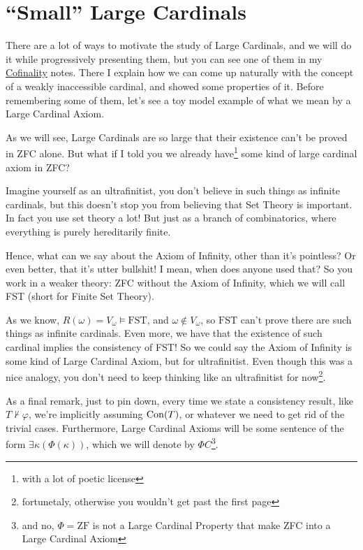 \chapter{``Small'' Large Cardinals}

There are a lot of ways to motivate the study of Large Cardinals, and we will do it while progressively presenting them, but you can see one of them in my \href{https://github.com/Xennonio/Cofinality}{Cofinality} notes. There I explain how we can come up naturally with the concept of a weakly inaccessible cardinal, and showed some properties of it. Before remembering some of them, let's see a toy model example of what we mean by a Large Cardinal Axiom.

As we will see, Large Cardinals are so large that their existence can't be proved in ZFC alone. But what if I told you we already have\footnote{with a lot of poetic license} some kind of large cardinal axiom in ZFC?

Imagine yourself as an ultrafinitist, you don't believe in such things as infinite cardinals, but this doesn't stop you from believing that Set Theory is important. In fact you use set theory a lot! But just as a branch of combinatorics, where everything is purely hereditarily finite.

Hence, what can we say about the Axiom of Infinity, other than it's pointless? Or even better, that it's utter bullshit! I mean, when does anyone used that? So you work in a weaker theory: ZFC without the Axiom of Infinity, which we will call FST (short for Finite Set Theory).

As we know, $R(\omega)=V_\omega\vDash\mathrm{FST}$, and $\omega\notin V_\omega$, so $\mathrm{FST}$ can't prove there are such things as infinite cardinals. Even more, we have that the existence of such cardinal implies the consistency of FST! So we could say the Axiom of Infinity is some kind of Large Cardinal Axiom, but for ultrafinitist. Even though this was a nice analogy, you don't need to keep thinking like an ultrafinitist for now\footnote{fortunetaly, otherwise you wouldn't get past the first page}.

As a final remark, just to pin down, every time we state a consistency result, like $T\nvdash\varphi$, we're implicitly assuming $\mathrm{Con}\!\left(T\right)$, or whatever we need to get rid of the trivial cases. Furthermore, Large Cardinal Axioms will be some sentence of the form $\exists\kappa(\Phi(\kappa))$, which we will denote by $\Phi C$\footnote{and no, $\Phi=\text{ZF}$ is not a Large Cardinal Property that make ZFC into a Large Cardinal Axiom}.


